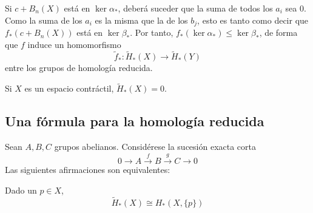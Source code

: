 Si $c+B_n(X)$ está en $\ker \alpha_*$, deberá suceder que la suma de todos los $a_i$ sea 0. Como la suma de los $a_i$ es la misma que la de los $b_j$, esto es tanto como decir que $f_*(c+B_n(X))$ está en $\ker \beta_*$. Por tanto, $f_*(\ker \alpha_*) \leq \ker \beta_*$, de forma que $f$ induce un homomorfismo $$\tilde{f}_*: \tilde{H}_*(X) \longrightarrow \tilde{H}_*(Y)$$ entre los grupos de homología reducida.

\begin{ejem} Si $X$ es un espacio contráctil, $\tilde{H}_*(X)=0$. \end{ejem}

\subsection{Una fórmula para la homología reducida}
\begin{lema}
Sean $A,B,C$ grupos abelianos. Considérese la sucesión exacta corta $$0 \longrightarrow A \xrightarrow{f} B \xrightarrow{g} C \longrightarrow 0$$ Las siguientes afirmaciones son equivalentes:
\end{lema}

\begin{prop} Dado un $p \in X$, $$\tilde{H}_*(X)\cong H_*(X,\{p\})$$\end{prop}

